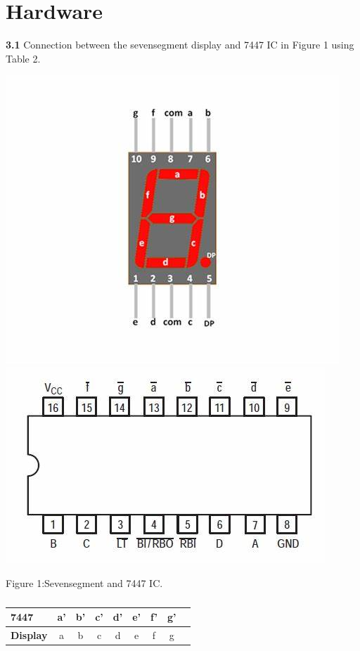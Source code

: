 \documentclass[10pt, a4paper]{article}
\begin{document}
	\section{Hardware}
	\textbf{3.1}
    Connection between the sevensegment display and 7447 IC in Figure 1 using Table 2.
    \begin{center}
\includegraphics[scale=.20]{sevenseg}
\includegraphics[scale=.20]{7447ic}
\end{center}
Figure 1:Sevensegment and 7447 IC.
	\begin{table}[htbp]
    \begin{center}
    \begin{tabular}{|l|c|c|c|c|c|c|c|c} \hline \textbf{7447}
  & a' & b' & c' & d' & e' & f' & g' \\
 \hline
\textbf{Display} & a & b & c & d & e & f & g \\ \hline
\end{tabular}   
\end{center}
\caption{\label{table:dummytable} }
\end{table}
\end{document}

